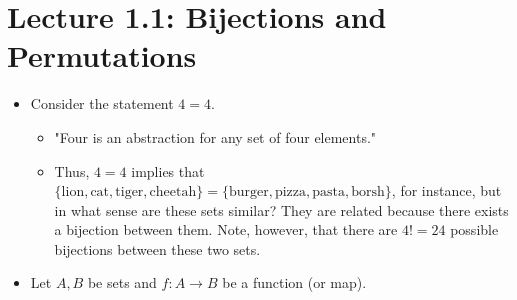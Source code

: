 \documentclass[../main.tex]{subfiles}
\begin{document}
\section{Lecture 1.1: Bijections and Permutations}
\begin{itemize}
    \item Consider the statement $4=4$.
    \begin{itemize}
        \item "Four is an abstraction for any set of four elements."
        \item Thus, $4=4$ implies that $\{\text{lion},\text{cat},\text{tiger},\text{cheetah}\}=\{\text{burger},\text{pizza},\text{pasta},\text{borsh}\}$, for instance, but in what sense are these sets similar? They are related because there exists a bijection between them. Note, however, that there are $4!=24$ possible bijections between these two sets.
    \end{itemize}
    \item Let $A,B$ be sets and $f:A\to B$ be a function (or map).
    \begin{figure}[h!]
        \centering
\end{figure}
\end{itemize}
\end{document}
